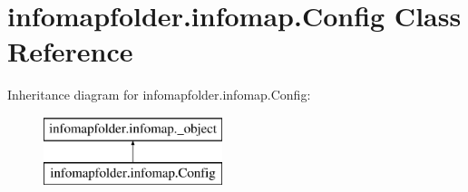 \hypertarget{classinfomapfolder_1_1infomap_1_1Config}{}\section{infomapfolder.\+infomap.\+Config Class Reference}
\label{classinfomapfolder_1_1infomap_1_1Config}
Inheritance diagram for infomapfolder.\+infomap.\+Config\+:\begin{figure}[H]
\begin{center}
\leavevmode
\includegraphics[height=2.000000cm]{classinfomapfolder_1_1infomap_1_1Config}
\end{center}
\end{figure}

